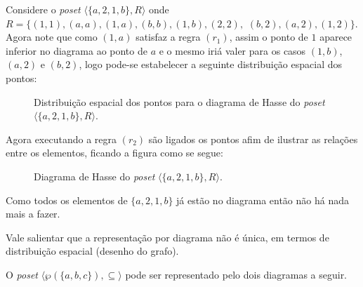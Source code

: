 \begin{example}
	Considere o \textit{poset} $\langle \{a, 2, 1, b\}, R \rangle$ onde $R = \{(1, 1), (a, a), (1, a), (b, b), (1, b), (2, 2),$ $(b, 2), (a, 2), (1, 2)\}$. Agora note que como $(1, a)$ satisfaz a regra $(r_1)$, assim o ponto de $1$ aparece inferior no diagrama ao ponto de $a$ e o mesmo iriá valer para os casos $(1, b)$, $(a, 2)$ e $(b, 2)$, logo pode-se estabelecer a seguinte distribuição espacial dos pontos:
	
	\begin{figure}[h]
		\centering
		\caption{Distribuição espacial dos pontos para o diagrama de Hasse do \textit{poset} $\langle \{a, 2, 1, b\}, R \rangle$.}
		\label{fig:PreDiagramaHasse}
	\end{figure}

	Agora executando a regra $(r_2)$ são ligados os pontos afim de ilustrar as relações entre os elementos, ficando a figura como se segue:
	
	\begin{figure}[h]
		\centering
		\caption{Diagrama de Hasse do \textit{poset} $\langle \{a, 2, 1, b\}, R \rangle$.}
		\label{fig:DiagramaHasse1}
	\end{figure}

	Como todos os elementos de $\{a, 2, 1, b\}$ já estão no diagrama então não há nada mais a fazer.
\end{example}

\begin{remark}
	Vale salientar que a representação por diagrama não é única, em termos de distribuição espacial (desenho do grafo).
\end{remark}

\begin{example}
	O \textit{poset} $\langle \wp(\{a, b, c\}), \subseteq \rangle$ pode ser representado pelo dois diagramas a seguir.
	
	
\end{example}
